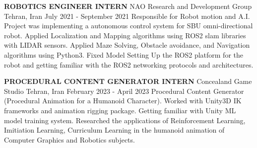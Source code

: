\begin{cventries}
	
    \cventry
    {\textbf{ROBOTICS ENGINEER INTERN}}
    {NAO Research and Development Group}
    {Tehran, Iran}
    {July 2021 - September 2021}
    {Responsible for Robot motion and A.I. \newline Project was implementing a autonomous control system for SBU omni-directional robot. Applied Localization and Mapping algorithms using ROS2 slam libraries with LIDAR sensors. \newline Applied Maze Solving, Obstacle avoidance, and Navigation algorithms using Python3. \newline Fixed Model \newline Setting Up the ROS2 platform for the robot and getting familiar with the ROS2 networking protocols and architectures.}   
    
\vspace{0.7 cm}
	
    \cventry
    {\textbf{PROCEDURAL CONTENT GENERATOR INTERN}}
    {Concealand Game Studio}
    {Tehran, Iran}
    {February 2023 - April 2023}
    {Procedural Content Generator (Procedural Animation for a Humanoid Character). \newline Worked with Unity3D IK frameworks and animation rigging package. \newline Getting familiar with Unity ML model training system. \newline Researched the applications of Reinforcement Learning, Imitiation Learning, Curriculum Learning in the humanoid animation of Computer Graphics and Robotics subjects.}   
    
\end{cventries}


